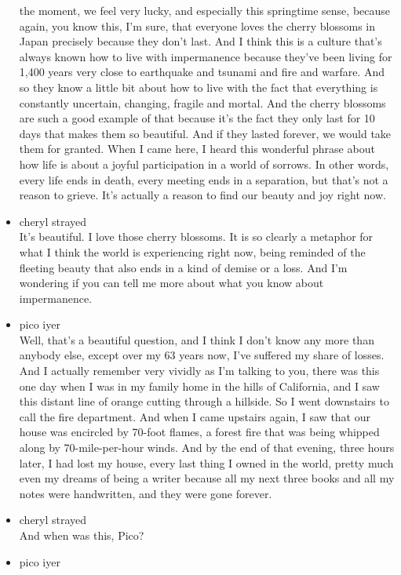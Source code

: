 \begin{itemize}
  the moment, we feel very lucky, and especially this springtime sense,
  because again, you know this, I'm sure, that everyone loves the cherry
  blossoms in Japan precisely because they don't last. And I think this
  is a culture that's always known how to live with impermanence because
  they've been living for 1,400 years very close to earthquake and
  tsunami and fire and warfare. And so they know a little bit about how
  to live with the fact that everything is constantly uncertain,
  changing, fragile and mortal. And the cherry blossoms are such a good
  example of that because it's the fact they only last for 10 days that
  makes them so beautiful. And if they lasted forever, we would take
  them for granted. When I came here, I heard this wonderful phrase
  about how life is about a joyful participation in a world of sorrows.
  In other words, every life ends in death, every meeting ends in a
  separation, but that's not a reason to grieve. It's actually a reason
  to find our beauty and joy right now.
\item
  cheryl strayed\\
  It's beautiful. I love those cherry blossoms. It is so clearly a
  metaphor for what I think the world is experiencing right now, being
  reminded of the fleeting beauty that also ends in a kind of demise or
  a loss. And I'm wondering if you can tell me more about what you know
  about impermanence.
\item
  pico iyer\\
  Well, that's a beautiful question, and I think I don't know any more
  than anybody else, except over my 63 years now, I've suffered my share
  of losses. And I actually remember very vividly as I'm talking to you,
  there was this one day when I was in my family home in the hills of
  California, and I saw this distant line of orange cutting through a
  hillside. So I went downstairs to call the fire department. And when I
  came upstairs again, I saw that our house was encircled by 70-foot
  flames, a forest fire that was being whipped along by 70-mile-per-hour
  winds. And by the end of that evening, three hours later, I had lost
  my house, every last thing I owned in the world, pretty much even my
  dreams of being a writer because all my next three books and all my
  notes were handwritten, and they were gone forever.
\item
  cheryl strayed\\
  And when was this, Pico?
\item
  pico iyer\\

\end{itemize}
